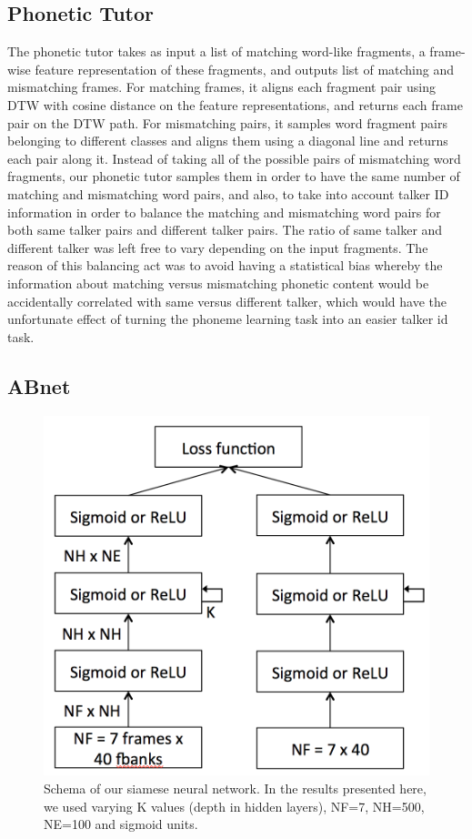 \documentclass[a4paper]{article}
\begin{document}
\subsection{Phonetic Tutor}
The phonetic tutor takes as input a list of matching word-like fragments, a frame-wise feature representation of these fragments, and outputs list of matching and mismatching frames. For matching frames, it aligns each fragment pair using DTW with cosine distance on the feature representations, and returns each frame pair on the DTW path. For mismatching pairs, it samples word fragment pairs belonging to different classes and aligns them using a diagonal line and returns each pair along it. Instead of taking all of the possible pairs of mismatching word fragments, our phonetic tutor samples them in order to have the same number of matching and mismatching word pairs, and also, to take into account talker ID information in order to balance the matching and mismatching word pairs for both same talker pairs and different talker pairs. The ratio of same talker and different talker was left free to vary depending on the input fragments. The reason of this balancing act was to avoid having a statistical bias whereby the information about matching versus mismatching phonetic content would be accidentally correlated with same versus different talker, which would have the unfortunate effect of turning the phoneme learning task into an easier talker id task.

\subsection{ABnet}
\begin{figure}[h]
    \begin{center}
        \includegraphics[width=0.68\columnwidth]{abnet}
        \caption{Schema of our siamese neural network. In the results presented here, we used varying K values (depth in hidden layers), NF=7, NH=500, NE=100 and sigmoid units.}
    \end{center}
    \label{fig:abnet}
\end{figure}
\end{document}
